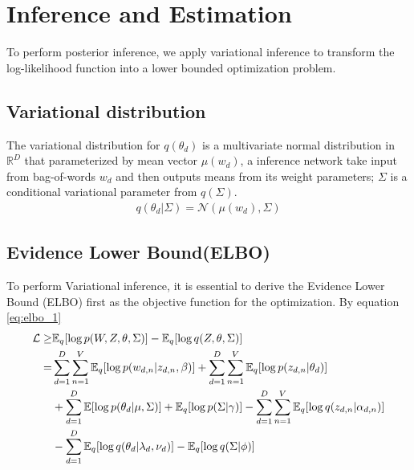 \section{Inference and Estimation}
To perform posterior inference, we apply variational inference to transform the log-likelihood function into a lower bounded optimization problem.
\subsection{Variational distribution}
The variational distribution for $ q(\theta_d) $ is a multivariate normal distribution in $ \mathbb{R}^{D} $ that parameterized by mean vector $ \mu(w_d) $, a inference network take input from bag-of-words $ w_d $ and then outputs means from its weight parameters; $ \Sigma $ is a conditional variational parameter from $ q(\Sigma) $. 
\begin{align*}
q(\theta_d|\Sigma)=\mathcal{N}(\mu(w_d),\Sigma)
\end{align*}
\subsection{Evidence Lower Bound(ELBO)}\label{ch4:2} To perform Variational inference, it is essential to derive the Evidence Lower Bound (ELBO) first as the objective function for the optimization. By equation \ref{eq:elbo_1}
\begin{align}\label{eq:elbo_1}
\mathcal{L}\geq&\mathbb{E}_q[\log p(W,Z,\theta,\Sigma)]-\mathbb{E}_q[\log q(Z,\theta,\Sigma)]\notag\\
=&\sum_{d=1}^{D}\sum_{n=1}^{V}\mathbb{E}_q[\log p(w_{d,n}|z_{d,n},\beta)]+\sum_{d=1}^{D}\sum_{n=1}^{V}\mathbb{E}_q[\log p(z_{d,n}|\theta_d)]\notag\\
&+\sum_{d=1}^{D}\mathbb{E}[\log p(\theta_d|\mu,\Sigma)]+\mathbb{E}_q[\log p(\Sigma|\gamma)]-\sum_{d=1}^{D}\sum_{n=1}^{V}\mathbb{E}_q[\log q(z_{d,n}|\alpha_{d,n})]\notag\\
&-\sum_{d=1}^{D}\mathbb{E}_q[\log q(\theta_d|\lambda_d,\nu_d)]-\mathbb{E}_q[\log q(\Sigma|\phi)]
\end{align}
